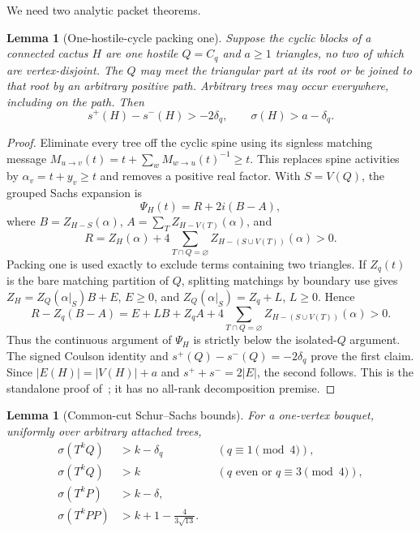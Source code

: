 \documentclass[11pt]{article}
\newtheorem{lemma}[theorem]{Lemma}
\newcommand{\spE}{s^+}
\newcommand{\smE}{s^-}
\newcommand{\sig}{\sigma}
\begin{document}
We need two analytic packet theorems.

\begin{lemma}[One-hostile-cycle packing one]\label{lem:packing}
Suppose the cyclic blocks of a connected cactus $H$ are one hostile $Q=C_q$
and $a\geq1$ triangles, no two of which are vertex-disjoint.  The $Q$ may meet
the triangular part at its root or be joined to that root by an arbitrary
positive path.  Arbitrary trees may occur everywhere, including on the path.
Then
\[
 \spE(H)-\smE(H)>-2\delta_q,
 \qquad \sig(H)>a-\delta_q.
\]
\end{lemma}

\begin{proof}
Eliminate every tree off the cyclic spine using its signless matching message
$M_{u\to v}(t)=t+\sum_wM_{w\to u}(t)^{-1}\geq t$.  This replaces spine
activities by $\alpha_v=t+y_v\geq t$ and removes a positive real factor.  With
$S=V(Q)$, the grouped Sachs expansion is
\[
 \Psi_H(t)=R+2i(B-A),
\]
where $B=Z_{H-S}(\alpha)$, $A=\sum_TZ_{H-V(T)}(\alpha)$, and
\[
 R=Z_H(\alpha)+4\sum_{T\cap Q=\varnothing}
 Z_{H-(S\cup V(T))}(\alpha)>0.
\]
Packing one is used exactly to exclude terms containing two triangles.  If
$Z_q(t)$ is the bare matching partition of $Q$, splitting matchings by boundary
use gives $Z_H=Z_Q(\alpha|_S)B+E$, $E\geq0$, and
$Z_Q(\alpha|_S)=Z_q+L$, $L\geq0$.  Hence
\[
 R-Z_q(B-A)=E+LB+Z_qA+4\sum_{T\cap Q=\varnothing}
 Z_{H-(S\cup V(T))}(\alpha)>0.
\]
Thus the continuous argument of $\Psi_H$ is strictly below the isolated-$Q$
argument.  The signed Coulson identity and
$\spE(Q)-\smE(Q)=-2\delta_q$ prove the first claim.  Since
$|E(H)|=|V(H)|+a$ and $\spE+\smE=2|E|$, the second follows.  This is the
standalone proof of~\cite{PackingOne}; it has no all-rank decomposition premise.
\end{proof}

\begin{lemma}[Common-cut Schur--Sachs bounds]\label{lem:common}
For a one-vertex bouquet, uniformly over arbitrary attached trees,
\begin{align}
 \sig(T^kQ)&>k-\delta_q &&(q\equiv1\pmod4),\label{eq:ccq}\\
 \sig(T^kQ)&>k &&(q\text{ even or }q\equiv3\pmod4),\label{eq:ccgood}\\
 \sig(T^kP)&>k-\delta,\label{eq:ccp}\\
 \sig(T^kPP)&>k+1-\frac4{3\sqrt{13}}.\label{eq:ccpp}
\end{align}
\end{lemma}
\end{document}

